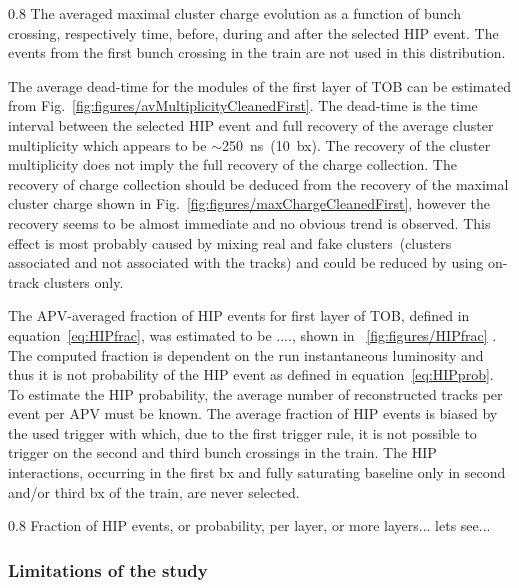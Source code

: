                  {0.8}       %
                 {The averaged maximal cluster charge evolution as a function of bunch crossing, respectively time, before, during and after the selected HIP event.  The events from the first bunch crossing in the train are not used in this distribution. } %

The average dead-time for the modules of the first layer of TOB can be estimated from Fig.~\ref{fig:figures/avMultiplicityCleanedFirst}. The dead-time is the time interval between the selected HIP event and full recovery of the average cluster multiplicity which appears to be $\sim$250~ns~(10~bx). The recovery of the cluster multiplicity does not imply the full recovery of the charge collection. The recovery of charge collection should be deduced from the recovery of the maximal cluster charge shown in Fig.~\ref{fig:figures/maxChargeCleanedFirst}, however the recovery seems to be almost immediate and no obvious trend is observed. This effect is most probably caused by mixing real and fake clusters~(clusters associated and not associated with the tracks) and could be reduced by using on-track clusters only.

The APV-averaged fraction of HIP events for first layer of TOB, defined in equation~\ref{eq:HIPfrac}, was estimated to be ...., shown in ~\ref{fig:figures/HIPfrac} . The computed fraction is dependent on the run instantaneous luminosity and thus it is not probability of the HIP event as defined in equation~\ref{eq:HIPprob}. To estimate the HIP probability, the average number of reconstructed tracks per event per APV must be known. The average fraction of HIP events is biased by the used trigger with which, due to the first trigger rule, it is not possible to trigger on the second and third bunch crossings in the train. The HIP interactions, occurring in the first bx and fully saturating baseline only in second and/or third bx of the train, are never selected.
 
                 {0.8}       %
                 {Fraction of HIP events, or probability, per layer, or more layers... lets see... } %

\subsubsection{Limitations of the study~\label{sec:limitationsSelection}}

